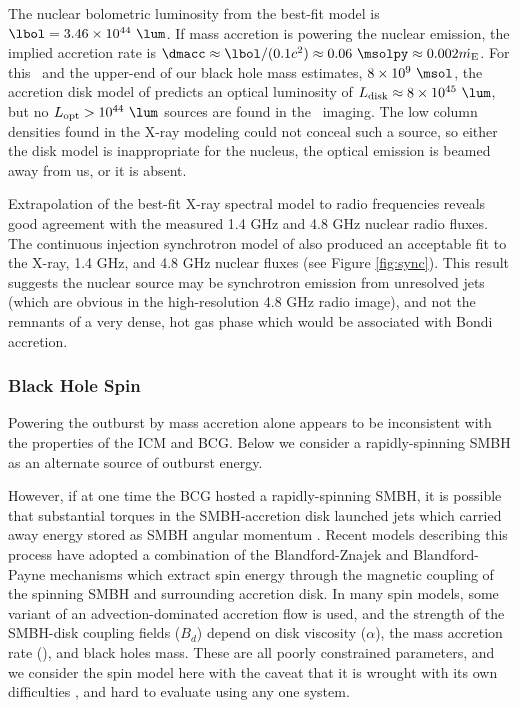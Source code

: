 \documentclass[11pt, preprint]{aastex}
\begin{document}
The nuclear bolometric luminosity from the best-fit model is $\lbol =
3.46 \times 10^{44} ~\lum$. If mass accretion is powering the nuclear
emission, the implied accretion rate is $\dmacc \approx \lbol/(0.1
c^2) \approx 0.06 ~\msolpy \approx 0.002 \dme$. For this \dmacc\ and
the upper-end of our black hole mass estimates, $8 \times 10^{9}
~\msol$, the accretion disk model of \citet{2002NewAR..46..247M}
predicts an optical luminosity of $\ldisk \approx 8 \times 10^{45}
~\lum$, but no $L_{\rm{opt}} > 10^{44} ~\lum$ sources are found in the
\hst\ imaging. The low column densities found in the X-ray modeling
could not conceal such a source, so either the disk model is
inappropriate for the nucleus, the optical emission is beamed away
from us, or it is absent.

Extrapolation of the best-fit X-ray spectral model to radio
frequencies reveals good agreement with the measured 1.4 GHz and 4.8
GHz nuclear radio fluxes. The continuous injection synchrotron model
of \citet{1987MNRAS.225..335H} also produced an acceptable fit to the
X-ray, 1.4 GHz, and 4.8 GHz nuclear fluxes (see Figure
\ref{fig:sync}). This result suggests the nuclear source may be
synchrotron emission from unresolved jets (which are obvious in the
high-resolution 4.8 GHz radio image), and not the remnants of a very
dense, hot gas phase which would be associated with Bondi accretion.

\subsubsection{Black Hole Spin}

Powering the outburst by mass accretion alone appears to be
inconsistent with the properties of the ICM and BCG. Below we consider
a rapidly-spinning SMBH as an alternate source of outburst energy.

However, if at
one time the BCG hosted a rapidly-spinning SMBH, it is possible that
substantial torques in the SMBH-accretion disk launched jets which
carried away energy stored as SMBH angular momentum
\citep{2002NewAR..46..247M}. Recent models describing this process
\citep[\eg][]{1999ApJ...522..753M, 2001ApJ...548L...9M,
  2006ApJ...651.1023R, 2007MNRAS.377.1652N, 2009MNRAS.397.1302B,
  gesspin} have adopted a combination of the Blandford-Znajek
\citep[BZ;][]{bz} and Blandford-Payne \citep[BP;][]{bp} mechanisms
which extract spin energy through the magnetic coupling of the
spinning SMBH and surrounding accretion disk. In many spin models,
some variant of an advection-dominated accretion flow
\citep[ADAF][]{adaf} is used, and the strength of the SMBH-disk
coupling fields ($B_d$) depend on disk viscosity ($\alpha$), the mass
accretion rate (\dme), and black holes mass. These are all poorly
constrained parameters, and we consider the spin model here with the
caveat that it is wrought with its own difficulties \citep[see][for
  thorough discussion]{msspin}, and hard to evaluate using any one
system.
\end{document}
